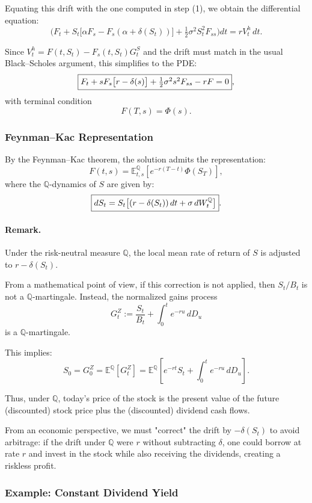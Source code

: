 \documentclass[12pt,a4paper]{article}
\theoremstyle{definition}
\begin{document}
Equating this drift with the one computed in step (1), we obtain the differential equation:
\[
\Big( F_t + S_t\big[\alpha F_s - F_s(\alpha + \delta(S_t))\big] + \tfrac{1}{2} \sigma^2 S_t^2 F_{ss} \Big) dt = r V_t^h\, dt.
\]

Since $V_t^h = F(t, S_t) - F_s(t, S_t) G_t^S$ and the drift must match in the usual Black--Scholes argument, this simplifies to the PDE:
\[
\fbox{$F_t + s F_s\big[r - \delta(s)\big] + \tfrac{1}{2} \sigma^2 s^2 F_{ss} - rF = 0$},
\]
with terminal condition
\[
F(T, s) = \Phi(s).
\]

\subsubsection{Feynman--Kac Representation}

By the Feynman--Kac theorem, the solution admits the representation:
\[
F(t, s) = \mathbb{E}^\mathbb{Q}_{t,s}\left[e^{-r(T-t)}\Phi(S_T)\right],
\]
where the $\mathbb{Q}$-dynamics of $S$ are given by:
\[
\fbox{$dS_t = S_t\big[(r - \delta(S_t))\, dt + \sigma\, dW_t^\mathbb{Q}\big]$}.
\]

\paragraph{Remark.}

Under the risk-neutral measure $\mathbb{Q}$, the local mean rate of return of $S$ is adjusted to $r - \delta(S_t)$.

From a mathematical point of view, if this correction is not applied, then $S_t/B_t$ is not a $\mathbb{Q}$-martingale. Instead, the normalized gains process
\[
G_t^Z := \frac{S_t}{B_t} + \int_0^t e^{-ru}\, dD_u
\]
is a $\mathbb{Q}$-martingale.

This implies:
\[
S_0 = G_0^Z = \mathbb{E}^\mathbb{Q}\left[G_t^Z\right] = \mathbb{E}^\mathbb{Q}\left[e^{-rt}S_t + \int_0^t e^{-ru}\, dD_u\right].
\]

Thus, under $\mathbb{Q}$, today's price of the stock is the present value of the future (discounted) stock price plus the (discounted) dividend cash flows.

From an economic perspective, we must "correct" the drift by $-\delta(S_t)$ to avoid arbitrage: if the drift under $\mathbb{Q}$ were $r$ without subtracting $\delta$, one could borrow at rate $r$ and invest in the stock while also receiving the dividends, creating a riskless profit.

\subsubsection{Example: Constant Dividend Yield}
\end{document}
